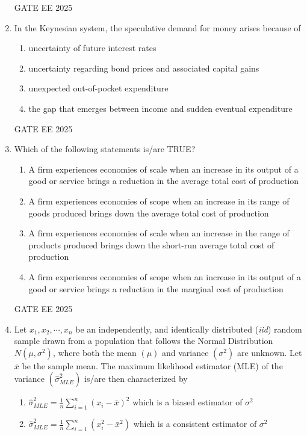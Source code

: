 \documentclass[journal,12pt,onecolumn]{IEEEtran}
\theoremstyle{remark}
\begin{document}
\begin{enumerate}
\begin{enumerate}[label=(\Alph*)]
    \end{enumerate}
GATE EE 2025\\
\item In the Keynesian system, the speculative demand for money arises because of
    \begin{enumerate}[label=(\Alph*)]
    \item uncertainty of future interest rates
    \item uncertainty regarding bond prices and associated capital gains
    \item unexpected out-of-pocket expenditure
    \item the gap that emerges between income and sudden eventual expenditure
    \end{enumerate}
GATE EE 2025\\
\item Which of the following statements is/are TRUE?
    \begin{enumerate}[label=(\Alph*)]
    \item A firm experiences economies of scale when an increase in its output of a good or service brings a reduction in the average total cost of production
    \item A firm experiences economies of scope when an increase in its range of goods produced brings down the average total cost of production
    \item A firm experiences economies of scale when an increase in the range of products produced brings down the short-run average total cost of production
    \item A firm experiences economies of scope when an increase in its output of a good or service brings a reduction in the marginal cost of production
    \end{enumerate}
    GATE EE 2025\\
    \item Let $x_1, x_2, \cdots, x_n$ be an independently, and identically distributed (\textit{iid}) random sample drawn from a population that follows the Normal Distribution $N(\mu, \sigma^2)$, where both the mean $(\mu)$ and variance $(\sigma^2)$ are unknown. Let $\bar{x}$ be the sample mean. The maximum likelihood estimator (MLE) of the variance $(\hat{\sigma}^2_{MLE})$ is/are then characterized by
    \begin{enumerate}[label=(\Alph*)]
    \item $\hat{\sigma}_{MLE}^2 = \frac{1}{n}\sum_{i=1}^{n}(x_i-\bar{x})^2$ which is a biased estimator of $\sigma^2$
    \item $\hat{\sigma}_{MLE}^2 = \frac{1}{n}\sum_{i=1}^{n}(x_i^2-\bar{x}^2)$ which is a consistent estimator of $\sigma^2$

\end{enumerate}
\end{enumerate}
\end{document}
